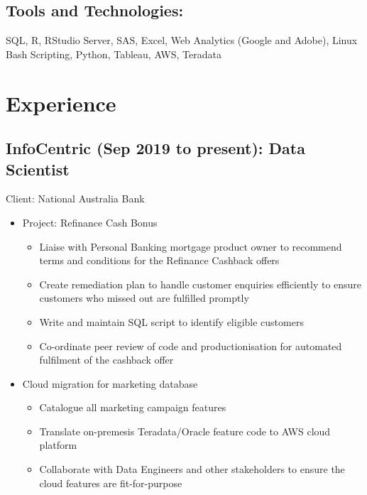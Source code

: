 \documentclass{article}
\begin{document}
\subsection{Tools and Technologies:}
SQL, R, RStudio Server, SAS, Excel, Web Analytics (Google and Adobe), Linux Bash Scripting, Python, Tableau, AWS, Teradata

\section{Experience}


\subsection{InfoCentric (Sep 2019 to present): Data Scientist}
Client: National Australia Bank
\begin{itemize}
    \item Project: Refinance Cash Bonus
        \begin{itemize}
            \item Liaise with Personal Banking mortgage product owner to recommend terms and conditions for the Refinance Cashback offers
            \item Create remediation plan to handle customer enquiries efficiently to ensure customers who missed out are fulfilled promptly
            \item Write and maintain SQL script to identify eligible customers
            \item Co-ordinate peer review of code and productionisation for automated fulfilment of the cashback offer
        \end{itemize}
    \item Cloud migration for marketing database
        \begin{itemize}
            \item Catalogue all marketing campaign features
            \item Translate on-premesis Teradata/Oracle feature code to AWS cloud platform
            \item Collaborate with Data Engineers and other stakeholders to ensure the cloud features are fit-for-purpose
        \end{itemize}
\end{itemize}
\end{document}
